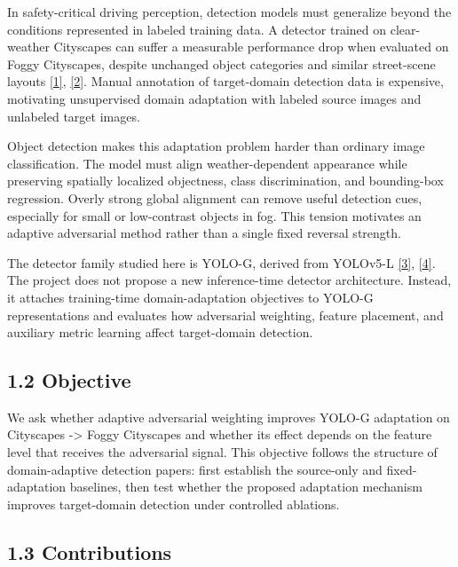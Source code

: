 \documentclass[
  11pt,
]{article}
\begin{document}
In safety-critical driving perception, detection models must generalize
beyond the conditions represented in labeled training data. A detector
trained on clear-weather Cityscapes can suffer a measurable performance
drop when evaluated on Foggy Cityscapes, despite unchanged object
categories and similar street-scene layouts
\protect\hyperlink{ref-cordts2016cityscapes}{{[}1{]}},
\protect\hyperlink{ref-sakaridis2018semanticfoggy}{{[}2{]}}. Manual
annotation of target-domain detection data is expensive, motivating
unsupervised domain adaptation with labeled source images and unlabeled
target images.

Object detection makes this adaptation problem harder than ordinary
image classification. The model must align weather-dependent appearance
while preserving spatially localized objectness, class discrimination,
and bounding-box regression. Overly strong global alignment can remove
useful detection cues, especially for small or low-contrast objects in
fog. This tension motivates an adaptive adversarial method rather than a
single fixed reversal strength.

The detector family studied here is YOLO-G, derived from YOLOv5-L
\protect\hyperlink{ref-wei2023yolog}{{[}3{]}},
\protect\hyperlink{ref-jocher2022yolov5}{{[}4{]}}. The project does not
propose a new inference-time detector architecture. Instead, it attaches
training-time domain-adaptation objectives to YOLO-G representations and
evaluates how adversarial weighting, feature placement, and auxiliary
metric learning affect target-domain detection.

\hypertarget{objective}{%
\subsection{1.2 Objective}\label{objective}}

We ask whether adaptive adversarial weighting improves YOLO-G adaptation
on Cityscapes -\textgreater{} Foggy Cityscapes and whether its effect
depends on the feature level that receives the adversarial signal. This
objective follows the structure of domain-adaptive detection papers:
first establish the source-only and fixed-adaptation baselines, then
test whether the proposed adaptation mechanism improves target-domain
detection under controlled ablations.

\hypertarget{contributions}{%
\subsection{1.3 Contributions}\label{contributions}}
\end{document}
